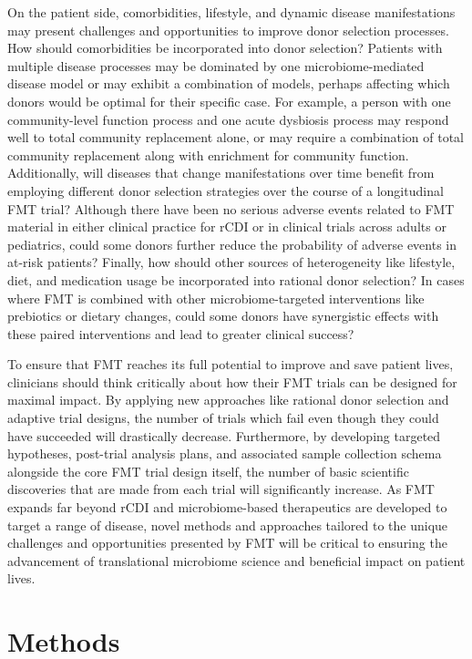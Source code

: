 On the patient side, comorbidities, lifestyle, and dynamic disease manifestations may present challenges and opportunities to improve donor selection processes.
How should comorbidities be incorporated into donor selection?
Patients with multiple disease processes may be dominated by one microbiome-mediated disease model or may exhibit a combination of models, perhaps affecting which donors would be optimal for their specific case.
For example, a person with one community-level function process and one acute dysbiosis process may respond well to total community replacement alone, or may require a combination of total community replacement along with enrichment for community function.
Additionally, will diseases that change manifestations over time benefit from employing different donor selection strategies over the course of a longitudinal FMT trial?
Although there have been no serious adverse events related to FMT material in either clinical practice for rCDI or in clinical trials across adults or pediatrics, could some donors further reduce the probability of adverse events in at-risk patients?
Finally, how should other sources of heterogeneity like lifestyle, diet, and medication usage be incorporated into rational donor selection?
In cases where FMT is combined with other microbiome-targeted interventions like prebiotics or dietary changes, could some donors have synergistic effects with these paired interventions and lead to greater clinical success?

To ensure that FMT reaches its full potential to improve and save patient lives, clinicians should think critically about how their FMT trials can be designed for maximal impact.
By applying new approaches like rational donor selection and adaptive trial designs, the number of trials which fail even though they could have succeeded will drastically decrease.
Furthermore, by developing targeted hypotheses, post-trial analysis plans, and associated sample collection schema alongside the core FMT trial design itself, the number of basic scientific discoveries that are made from each trial will significantly increase.
As FMT expands far beyond rCDI and microbiome-based therapeutics are developed to target a range of disease, novel methods and approaches tailored to the unique challenges and opportunities presented by FMT will be critical to ensuring the advancement of translational microbiome science and beneficial impact on patient lives.

\section{Methods}

